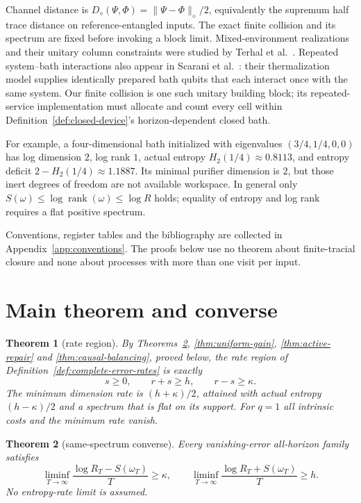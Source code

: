 \documentclass[11pt,a4paper]{article}
\numberwithin{equation}{section}
\theoremstyle{plain}
\newtheorem{theorem}{Theorem}[section]
\theoremstyle{definition}
\DeclareMathOperator{\rank}{rank}
\newcommand{\Ddiam}{D_{\diamond}}          %
\begin{document}
Channel distance is
$\Ddiam(\Psi,\Phi)=\lVert\Psi-\Phi\rVert_{\diamond}/2$, equivalently the
supremum half trace distance on reference-entangled inputs. The exact finite
collision and its spectrum are fixed before invoking a block limit.
Mixed-environment realizations and their unitary column constraints were
studied by Terhal et al.\ \cite[Eqs.~(6)--(8)]{Terhal1998}. Repeated system--bath
interactions also appear in Scarani et al.\ \cite[Eqs.~(1)--(2)]{Scarani2002}: their
thermalization model supplies identically prepared bath qubits that each
interact once with the same system. Our finite collision is one such unitary
building block; its repeated-service implementation must allocate and count
every cell within Definition~\ref{def:closed-device}'s horizon-dependent
closed bath.

For example, a four-dimensional bath initialized with eigenvalues
$(3/4,1/4,0,0)$ has log dimension $2$, log rank $1$, actual entropy
$H_2(1/4)\approx 0.8113$, and entropy deficit $2-H_2(1/4)\approx 1.1887$. Its
minimal purifier dimension is $2$, but those inert degrees of freedom are not
available workspace. In general only $S(\omega)\le\log\rank(\omega)\le\log R$
holds; equality of entropy and log rank requires a flat positive spectrum.

Conventions, register tables and the bibliography are collected in
Appendix~\ref{app:conventions}. The proofs below use no theorem about
finite-tracial closure and none about processes with more than one visit per
input.

\section{Main theorem and converse}
\label{sec:main-converse}

\begin{theorem}[rate region]
\label{thm:rate-region}
By Theorems~\ref{thm:same-spectrum-converse}, \ref{thm:uniform-gain},
\ref{thm:active-repair} and \ref{thm:causal-balancing}, proved below, the rate
region of Definition~\ref{def:complete-error-rates} is exactly
\[
s\ge 0,\qquad r+s\ge h,\qquad r-s\ge\kappa .
\]
The minimum dimension rate is $(h+\kappa)/2$, attained with actual entropy
$(h-\kappa)/2$ and a spectrum that is flat on its support. For $q=1$ all
intrinsic costs and the minimum rate vanish.
\end{theorem}

\begin{theorem}[same-spectrum converse]
\label{thm:same-spectrum-converse}
Every vanishing-error all-horizon family satisfies
\[
\liminf_{T\to\infty}\frac{\log R_T-S(\omega_T)}{T}\ge\kappa,
\qquad
\liminf_{T\to\infty}\frac{\log R_T+S(\omega_T)}{T}\ge h .
\]
No entropy-rate limit is assumed.
\end{theorem}
\end{document}
